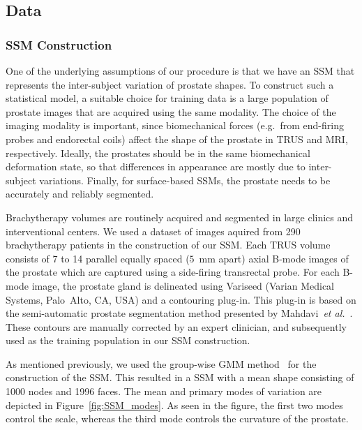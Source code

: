 \documentclass[journal]{IEEEtran}
\begin{document}
\subsection{Data}
\subsubsection{SSM Construction}\label{sec:ssm}
One of the underlying assumptions of our procedure is that we have an SSM that represents the inter-subject variation of prostate shapes.  To construct such a statistical model, a suitable choice for training data is a large population of prostate images that are acquired using the same modality. The choice of the imaging modality is important, since biomechanical forces (e.g.~from end-firing probes and endorectal coils) affect the shape of the prostate in TRUS and MRI, respectively. Ideally, the prostates should be in the same biomechanical deformation state, so that differences in appearance are mostly due to inter-subject variations. Finally, for surface-based SSMs, the prostate needs to be accurately and reliably segmented.

Brachytherapy volumes are routinely acquired and segmented in large clinics and interventional centers. We used a dataset of images aquired from 290 brachytherapy patients in the construction of our SSM. Each TRUS volume consists of 7 to 14 parallel equally spaced ($5$~mm apart) axial B-mode images of the prostate which are captured using a side-firing transrectal probe. For each B-mode image, the prostate gland is delineated using Variseed (Varian Medical Systems, Palo~Alto, CA, USA) and a contouring plug-in. This plug-in is based on the semi-automatic prostate segmentation method presented by Mahdavi~\textit{et al.}~\cite{Mahdavi11a}. These contours are manually corrected by an expert clinician, and subsequently used as the training population in our SSM construction.

As mentioned previously, we used the group-wise GMM method~\cite{Rasoulian12b} for the construction of the SSM. This resulted in a SSM with a mean shape consisting of 1000 nodes and 1996 faces. The mean and primary modes of variation are depicted in Figure~\ref{fig:SSM_modes}. As seen in the figure, the first two modes control the scale, whereas the third mode controls the curvature of the prostate.
\end{document}
